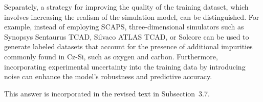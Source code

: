 \documentclass[a4paper,fleqn]{cas-sc}
\begin{document}
Separately, a strategy for improving the quality of the training dataset,
which involves increasing the realism of the simulation model, can be distinguished.
For example, instead of employing SCAPS, three-dimensional simulators such as Synopsys Sentaurus TCAD,
Silvaco ATLAS TCAD, or Solcore can be used to generate labeled datasets
that account for the presence of additional impurities commonly found in Cz-Si,
such as oxygen and carbon.
Furthermore, incorporating experimental uncertainty into the training data by introducing noise
can enhance the model’s robustness and predictive accuracy.

This answer is incorporated in the revised text in Subsection~3.7.


%
%
%
%
%
\end{document}
